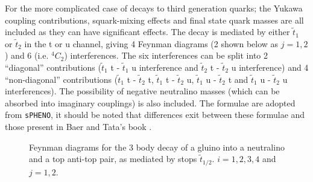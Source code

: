 \documentclass[final,3p,times]{elsarticle}
\begin{document}
\vspace{1cm}

For the more complicated case of decays to third generation quarks; the Yukawa coupling contributions, squark-mixing effects and final state quark masses are all included as they can have significant effects. The decay is mediated by either $\tilde{t}_1$ or $\tilde{t}_2$ in the t or u channel, giving 4 Feynman diagrams (2 shown below as $j=1,2$) and 6 (i.e. $^4 C _2$) interferences. The six interferences can be split into 2 ``diagonal'' contributions ($\tilde{t}_1$ t - $\tilde{t}_1$ u interference and $\tilde{t}_2$ t - $\tilde{t}_2$ u interference) and 4 ``non-diagonal'' contributions ($\tilde{t}_1$ t - $\tilde{t}_2$ t, $\tilde{t}_1$ t - $\tilde{t}_2$ u, $\tilde{t}_1$ u - $\tilde{t}_2$ t and $\tilde{t}_1$ u - $\tilde{t}_2$ u interferences). The possibility of negative neutralino masses (which can be absorbed into imaginary couplings) is also included. The formulae are adopted from {\tt sPHENO}, it should be noted that differences exit between these formulae and those present in Baer and Tata's book \cite{TataBaer}.
\begin{figure}
  \caption{Feynman diagrams for the 3 body decay of a gluino into a
    neutralino and a top anti-top pair, as mediated by stops
    $\tilde{t}_{1/2}$. $i=1,2,3,4$ and $j=1,2$.} \label{gneutqqdiag}
\end{figure} 
\end{document}
